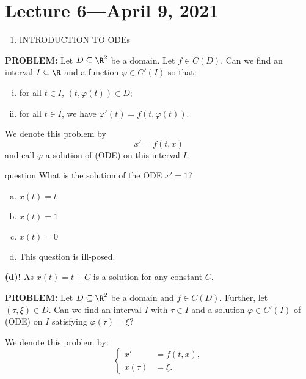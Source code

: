 \documentclass[class=article, crop=false]{standalone}
\begin{document}
\section{Lecture 6---April 9, 2021}

\begin{enumerate}[$\bullet$]
  \item INTRODUCTION TO ODEs
\end{enumerate}

\textbf{PROBLEM:} Let $D \subseteq \R^2$ be a domain. Let $f \in C(D)$. Can we find an interval $I \subseteq \R$ and a function $\varphi \in C'(I)$ so that:
\begin{enumerate}[(i)]
  \item for all $t \in I$, $(t,\varphi(t)) \in D$;
  \item for all $t \in I$, we have $\varphi'(t) = f(t,\varphi(t))$.
\end{enumerate}

\begin{nota}
  We denote this problem by
    \[
      x' = f(t,x) \tag{ODE}
    \]
  and call $\varphi$ a solution of (ODE) on this interval $I$.
\end{nota}

\begin{understandingcheck}{question}
  What is the solution of the ODE $x'=1$?
  \begin{enumerate}[(a)]
    \item $x(t)=t$
    \item $x(t)=1$
    \item $x(t)=0$
    \item This question is ill-posed.
  \end{enumerate}

  \textbf{(d)!} As $x(t) = t+C$ is a solution for any constant $C$.
\end{understandingcheck}

\textbf{PROBLEM:} Let $D \subseteq \R^2$ be a domain and $f \in C(D)$. Further, let $(\tau, \xi) \in D$. Can we find an interval $I$ with $\tau \in I$ and a solution $\varphi \in C'(I)$ of (ODE) on $I$ satisfying $\varphi(\tau) = \xi$?

\begin{nota}
  We denote this problem by:
    \[
      \begin{cases}
        x'&=f(t,x), \\
        x(\tau) &= \xi.
      \end{cases}
      \tag{IVP}
    \]
\end{nota}
\end{document}
